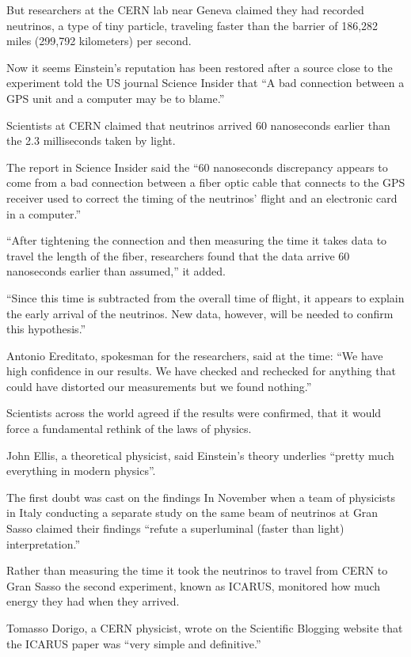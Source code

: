 \documentclass[11pt]{article}
\begin{document}
But researchers at the CERN lab near Geneva claimed they had recorded
neutrinos, a type of tiny particle, traveling faster than the barrier
of 186,282 miles (299,792 kilometers) per second.

Now it seems Einstein's reputation has been restored after a source
close to the experiment told the US journal Science Insider that ``A
bad connection between a GPS unit and a computer may be to blame.''

Scientists at CERN claimed that neutrinos arrived 60 nanoseconds
earlier than the 2.3 milliseconds taken by light.

The report in Science Insider said the ``60 nanoseconds discrepancy
appears to come from a bad connection between a fiber optic cable that
connects to the GPS receiver used to correct the timing of the
neutrinos' flight and an electronic card in a computer.''

``After tightening the connection and then measuring the time it takes
data to travel the length of the fiber, researchers found that the
data arrive 60 nanoseconds earlier than assumed,'' it added.

``Since this time is subtracted from the overall time of flight, it
appears to explain the early arrival of the neutrinos. New data,
however, will be needed to confirm this hypothesis.''

Antonio Ereditato, spokesman for the researchers, said at the time:
``We have high confidence in our results. We have checked and
rechecked for anything that could have distorted our measurements but
we found nothing.''

Scientists across the world agreed if the results were confirmed, that
it would force a fundamental rethink of the laws of physics.

John Ellis, a theoretical physicist, said Einstein’s theory underlies
``pretty much everything in modern physics''.

The first doubt was cast on the findings In November when a team of
physicists in Italy conducting a separate study on the same beam of
neutrinos at Gran Sasso claimed their findings ``refute a superluminal
(faster than light) interpretation.''

Rather than measuring the time it took the neutrinos to travel from
CERN to Gran Sasso the second experiment, known as ICARUS, monitored
how much energy they had when they arrived.

Tomasso Dorigo, a CERN physicist, wrote on the Scientific Blogging
website that the ICARUS paper was ``very simple and definitive.''
\end{document}
